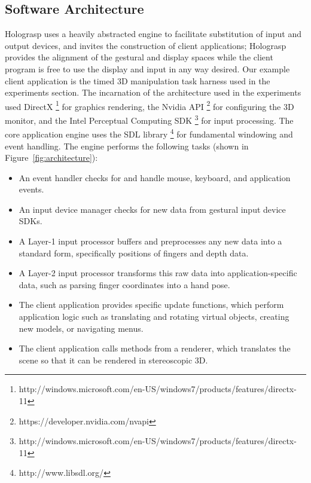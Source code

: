 \documentclass[pageno]{jpaper}
\begin{document}
\subsection{Software Architecture}
Holograsp uses a heavily abstracted engine to facilitate substitution of input and output devices, and invites the construction of
client applications; Holograsp provides the alignment of the
gestural and display spaces while the client program is free to use the display and input in any way desired. Our example client application
is the timed 3D manipulation task harness used in the experiments section. The incarnation of the architecture used in the
experiments used DirectX \footnote{http://windows.microsoft.com/en-US/windows7/products/features/directx-11} for graphics rendering, the Nvidia API \footnote{https://developer.nvidia.com/nvapi} for configuring the 3D monitor, and the Intel Perceptual
Computing SDK \footnote{http://windows.microsoft.com/en-US/windows7/products/features/directx-11} for input processing.
The core application engine uses the SDL library \footnote{http://www.libsdl.org/} for fundamental windowing and event handling.
The engine performs the following tasks (shown in Figure~\ref{fig:architecture}):
\begin{itemize}
\item An event handler checks for and handle mouse, keyboard, and application events.
\item An input device manager checks for new data from gestural input device SDKs.
\item A Layer-1 input processor buffers and preprocesses any new data into a standard form, specifically positions of fingers and depth data.
\item A Layer-2 input processor transforms this raw data into application-specific data, such as parsing finger coordinates into a hand pose.
\item The client application provides specific update functions, which perform
application logic such as translating and rotating virtual objects, creating new models, or navigating menus.
\item The client application calls methods from a renderer, which translates the scene so that it can be rendered in stereoscopic 3D.
\end{itemize}
\end{document}
